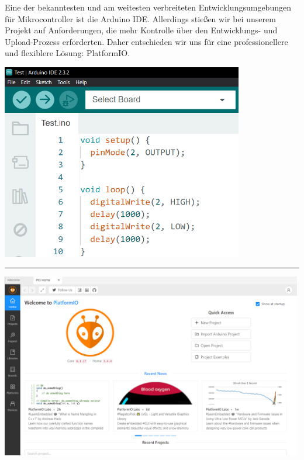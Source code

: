 \documentclass[
    headings=optiontotocandhead,%
    twoside,
    numbers=noenddot,%
    12pt, %
    titlepage, %
    parskip=full, %
    listof=leveldown, 
    numbers=noenddot, %
    a4paper,DIV=14,
    BCOR=15mm,
]{scrbook}
\let\origfigure=\figure
\let\endorigfigure=\endfigure
\renewenvironment{figure}[1][]{%
   \origfigure[H]
}{%
   \endorigfigure
}
\begin{document}
Eine der bekanntesten und am weitesten verbreiteten
Entwicklungsumgebungen für Mikrocontroller ist die Arduino IDE.
Allerdings stießen wir bei unserem Projekt auf Anforderungen, die mehr
Kontrolle über den Entwicklungs- und Upload-Prozess erforderten. Daher
entschieden wir uns für eine professionellere und flexiblere Lösung:
PlatformIO.

\begin{figure}
\centering
\includegraphics[width=4.16667in,height=\textheight]{img/Kampl/ArduinoIDE.png}
\caption{ArduinoIDE}
\end{figure}

\begin{center}\rule{0.5\linewidth}{0.5pt}\end{center}

\begin{figure}
\centering
\includegraphics[width=5.20833in,height=\textheight]{img/Kampl/PlatformIO.png}
\caption{PlatformIO}
\end{figure}
\end{document}
